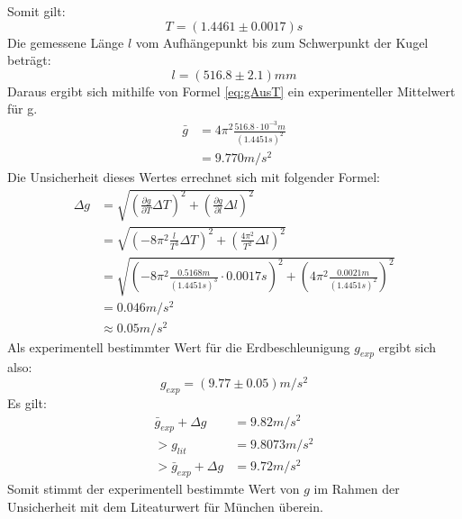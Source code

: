 \documentclass{report}
\begin{document}
Somit gilt:
\begin{equation*}
    \boxed{T = (1.4461 \pm 0.0017)s}
\end{equation*}
Die gemessene Länge $l$ vom Aufhängepunkt bis zum Schwerpunkt der Kugel beträgt:
\begin{equation*}
    l = (516.8 \pm 2.1)mm
\end{equation*}
Daraus ergibt sich mithilfe von Formel \ref{eq:gAusT} ein experimenteller Mittelwert für g.
\begin{equation}
    \begin{split}
        \bar{g} &= 4 {\pi}^2 \frac{516.8 \cdot 10^{-3}m}{(1.4451s)^2} \\
                &= 9.770m/s^2
    \end{split}
\end{equation}
Die Unsicherheit dieses Wertes errechnet sich mit folgender Formel:
\begin{equation}
    \begin{split}
        \Delta g &= \sqrt{(\frac{\partial g}{\partial T} \Delta T)^2+(\frac{\partial g}{\partial l} \Delta l)^2} \\
                 &= \sqrt{(-8 \pi^2 \frac{l}{T^3} \Delta T)^2 + (\frac{4 \pi^2}{T^2} \Delta l)^2} \\
                 &= \sqrt{(-8 \pi^2 \frac{0.5168m}{(1.4451s)^3} \cdot 0.0017s)^2 + (4 \pi^2 \frac{0.0021m}{(1.4451s)^2})^2} \\
                 &= 0.046 m/s^2 \\
                 &\approx 0.05 m/s^2
    \end{split}
\end{equation}
Als experimentell bestimmter Wert für die Erdbeschleunigung $g_{exp}$ ergibt sich also:
\begin{equation*}
    \boxed{g_{exp} = (9.77 \pm 0.05)m/s^2}
\end{equation*}
Es gilt:
\begin{equation}
    \begin{split}
        \bar{g}_{exp} + \Delta g  &= 9.82m/s^2 \\
                        > g_{lit} &= 9.8073m/s^2 \\
       > \bar{g}_{exp} + \Delta g &= 9.72m/s^2
    \end{split}
\end{equation}
Somit stimmt der experimentell bestimmte Wert von $g$ im Rahmen der Unsicherheit mit dem Liteaturwert für München überein.
\end{document}
